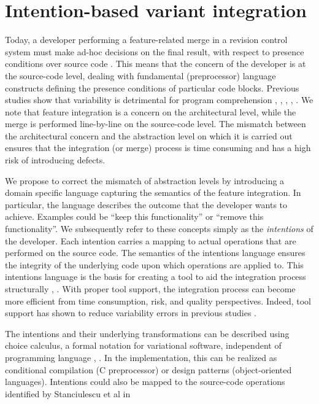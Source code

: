 \section{Intention-based variant integration}
Today, a developer performing a feature-related merge in a revision control system must make ad-hoc decisions on the final result, with respect to presence conditions over source code \cite{stanciulescu2016concepts}. This means that the concern of the developer is at the source-code level, dealing with fundamental (preprocessor) language constructs defining the presence conditions of particular code blocks. Previous studies show that variability is detrimental for program comprehension \cite{melo2016latin}, \cite{favre1997understanding}, \cite{ernst2002preprocessor}, \cite{abal2014variability}, \cite{medeiros2015preprocessor} . We note that feature integration is a concern on the architectural level, while the merge is performed line-by-line on the source-code level. The mismatch between the architectural concern and the abstraction level on which it is carried out ensures that the integration (or merge) process is time consuming and has a high risk of introducing defects.

We propose to correct the mismatch of abstraction levels by introducing a domain specific language capturing the semantics of the feature integration. In particular, the language describes the outcome that the developer wants to achieve. Examples could be ``keep this functionality'' or ``remove this functionality''. We subsequently refer to these concepts simply as the \textit{intentions} of the developer. Each intention carries a mapping to actual operations that are performed on the source code. The semantics of the intentions language ensures the integrity of the underlying code upon which operations are applied to. This intentions language is the basis for creating a tool to aid the integration process structurally \cite{mens2002}, \cite{apel2011}. With proper tool support, the integration process can become more efficient from time consumption, risk, and quality perspectives. Indeed, tool support has shown to reduce variability errors in previous studies \cite{ribeiro2014emergent}.

The intentions and their underlying transformations can be described using choice calculus, a formal notation for variational software, independent of programming language \cite{erwig2011choice}, \cite{walkingshaw2012choice}. In the implementation, this can be realized as conditional compilation (C preprocessor) or design patterns (object-oriented languages). Intentions could also be mapped to the source-code operations identified by Stanciulescu et al in \cite{stanciulescu2016concepts}

